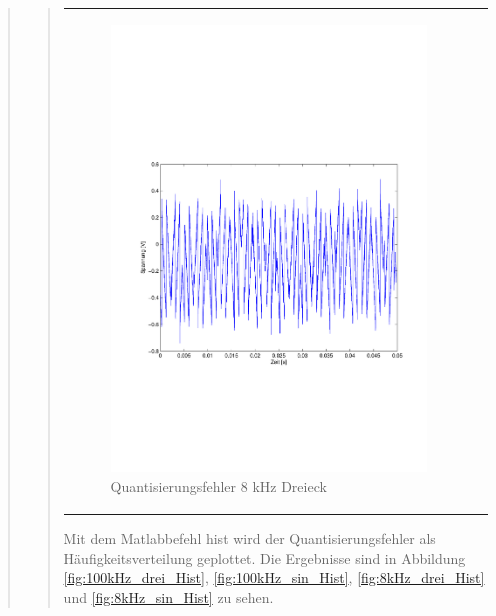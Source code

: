 \begin{quote}
\begin{quote}
\begin{center}
\begin{tabular}{ll}
                \begin{minipage}{0.6\textwidth}
                    \begin{figure}[H]
                        \includegraphics[scale=0.5, trim = 16mm 70mm 16mm 85mm, clip]
                                        {Bilder/8kHz_dreieck_Quantisierungsfehler}
                        \caption{Quantisierungsfehler 8 kHz Dreieck}
                        \label{fig:QuantErr 8 kHz Dreieck}
                    \end{figure}
                \end{minipage}
            
            \end{tabular}
        \end{center}
        \vspace{2em}
         
        Mit dem Matlabbefehl hist wird der Quantisierungsfehler als Häufigkeitsverteilung geplottet. Die Ergebnisse sind in
        Abbildung \ref{fig:100kHz_drei_Hist}, \ref{fig:100kHz_sin_Hist}, \ref{fig:8kHz_drei_Hist} und
        \ref{fig:8kHz_sin_Hist} zu sehen.
        

\end{quote}
\end{quote}
